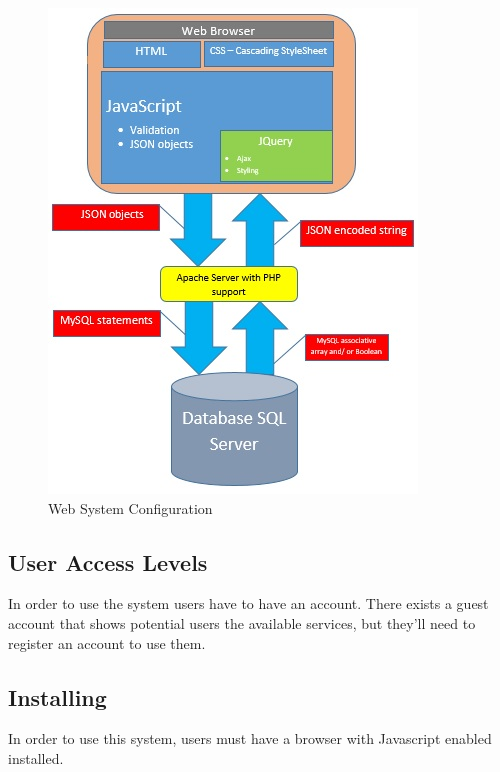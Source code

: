 \begin{figure}[h]
	\centering
	\includegraphics[scale=0.69]{images/webconfig.jpg}
	\caption{Web System Configuration}
\end{figure}

\subsection{User Access Levels}
In order to use the system users have to have an account. There exists a guest account that shows potential users the available services, but they'll need to register an account to use them.

\subsection{Installing}
\par{In order to use this system, users must have a browser with Javascript enabled installed.}
